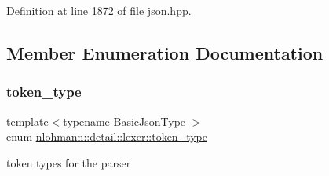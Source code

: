 Definition at line 1872 of file json.\+hpp.



\subsection{Member Enumeration Documentation}
\mbox{\label{classnlohmann_1_1detail_1_1lexer_a3f313cdbe187cababfc5e06f0b69b098}} 
\subsubsection{\texorpdfstring{token\+\_\+type}{token\_type}}
{\footnotesize\ttfamily template$<$typename Basic\+Json\+Type $>$ \\
enum \hyperlink{classnlohmann_1_1detail_1_1lexer_a3f313cdbe187cababfc5e06f0b69b098}{nlohmann\+::detail\+::lexer\+::token\+\_\+type}\hspace{0.3cm}{\ttfamily [strong]}}



token types for the parser 

